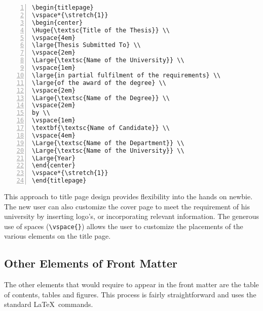 \documentclass{pracjourn}
\begin{document}
\begin{Verbatim}[frame=lines, xleftmargin=2mm, framesep=2mm, numbers=left, firstnumber=last]
\begin{titlepage}
\vspace*{\stretch{1}}
\begin{center}
\Huge{\textsc{Title of the Thesis}} \\
\vspace{4em}
\large{Thesis Submitted To} \\
\vspace{2em}
\Large{\textsc{Name of the University}} \\
\vspace{1em}
\large{in partial fulfilment of the requirements} \\
\large{of the award of the degree} \\
\vspace{2em}
\Large{\textsc{Name of the Degree}} \\
\vspace{2em}
by \\
\vspace{1em}
\textbf{\textsc{Name of Candidate}} \\
\vspace{4em}
\Large{\textsc{Name of the Department}} \\
\Large{\textsc{Name of the University}} \\
\Large{Year}
\end{center}
\vspace*{\stretch{1}}
\end{titlepage}
\end{Verbatim}

This approach to title page design provides flexibility into the hands on
newbie. The new user can also  customize the cover page to meet the requirement
of his university by inserting logo's, or incorporating relevant information.
The generous use of spaces (\verb|\vspace{}|) allows the user to customize the
placements of the various elements on the title page.

\subsection{Other Elements of Front Matter}

The other elements that would require to appear in the front matter are the
table of contents, tables and figures.  This process is fairly straightforward
and uses the standard \LaTeX\ commands.
\end{document}
